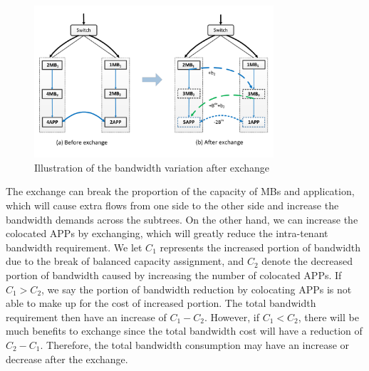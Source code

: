\documentclass[review]{elsarticle}
\begin{document}
\begin{figure}
	\centering
	\includegraphics[width=3.5in]{fig/exchange_example.pdf}
	\caption{Illustration of the bandwidth variation after exchange}
    \label{fig:exchange}
\end{figure}
The exchange can break the proportion of the capacity of MBs and application, which will cause extra flows from one side to the other side and increase the bandwidth demands across the subtrees. On the other hand, we can increase the colocated APPs by exchanging, which will greatly reduce the intra-tenant bandwidth requirement. We let $C_1$ represents the increased portion of bandwidth due to the break of balanced capacity assignment, and $C_2$ denote the decreased portion of bandwidth caused by increasing the number of colocated APPs. If $C_1>C_2$, we say the portion of bandwidth reduction by colocating APPs is not able to make up for the cost of increased portion. The total bandwidth requirement then have an increase of $C_1-C_2$. However, if $C_1<C_2$, there will be much benefits to exchange since the total bandwidth cost will have a reduction of $C_2-C_1$. Therefore, the total bandwidth consumption may have an increase or decrease after the exchange.
\end{document}
